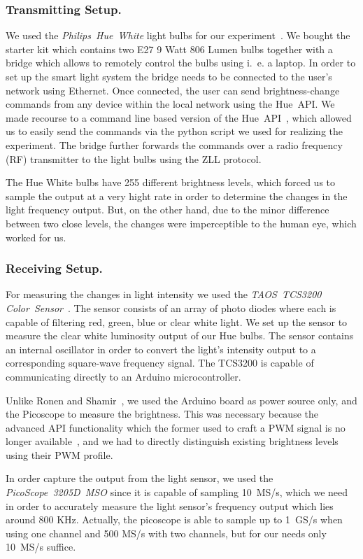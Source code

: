 \subsubsection{Transmitting Setup.} We used the \textit{Philips~Hue~White} light bulbs for our experiment~\cite{Philips:2018:Hue}. We bought the starter kit which contains two E27 9 Watt 806 Lumen bulbs together with a bridge which allows to remotely control the bulbs using i.~e. a laptop. In order to set up the smart light system the bridge needs to be connected to the user's network using Ethernet. Once connected, the user can send brightness-change commands from any device within the local network using the Hue~API. We made recourse to a command line based version of the Hue~API~\cite{Bahamas10:2018:HueApi}, which allowed us to easily send the commands via the python script we used for realizing the experiment. The bridge further forwards the commands over a radio frequency (RF) transmitter to the light bulbs using the ZLL protocol.

The Hue White bulbs have 255 different brightness levels, which forced us to sample the output at a very hight rate in order to determine the changes in the light frequency output. But, on the other hand, due to the minor difference between two close levels, the changes were imperceptible to the human eye, which worked for us.

\subsubsection{Receiving Setup.} For measuring the changes in light intensity we used the \textit{TAOS~TCS3200 Color~Sensor}~\cite{DFRobot:2018:Sensor}. The sensor consists of an array of photo diodes where each is capable of filtering red, green, blue or clear white light. We set up the sensor to measure the clear white luminosity output of our Hue bulbs. The sensor contains an internal oscillator in order to convert the light's intensity output to a corresponding square-wave frequency signal. The TCS3200 is capable of communicating directly to an Arduino microcontroller.

Unlike Ronen and Shamir~\cite{Ronen:2016:EFAIDCSL}, we used the Arduino board as power source only, and the Picoscope to measure the brightness. This was necessary because the advanced API functionality which the former used to craft a PWM signal is no longer available~\cite{Ronen:2016:EFAIDCSL}, and we had to directly distinguish existing brightness levels using their PWM profile.

In order capture the output from the light sensor, we used the \textit{PicoScope~3205D~MSO} since it is capable of sampling 10~MS/s, which we need in order to accurately measure the light sensor's frequency output which lies around 800 KHz. Actually, the picoscope is able to sample up to 1~GS/s when using one channel and 500 MS/s with two channels, but for our needs only 10~MS/s suffice.

